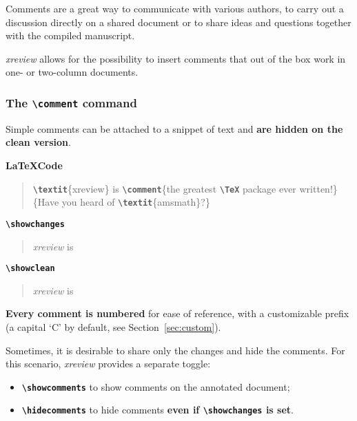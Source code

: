 \documentclass[a4paper]{ltxdoc}
\newcommand{\writecommand}[1]{\texttt{\textbf{{\textbackslash#1}}}}
\newcommand{\writearg}[1]{\{#1\}}
\begin{document}
Comments are a great way to communicate with various authors, to carry out a discussion directly on a shared document or to share ideas and questions together with the compiled manuscript.

\textit{xreview} allows for the possibility to insert comments that out of the box work in one- or two-column documents. 

\subsubsection{The \writecommand{comment} command}

Simple comments can be attached to a snippet of text and \textbf{are hidden on the clean version}. 

\textbf{\LaTeX Code}

\begin{quote}
\writecommand{textit}\writearg{xreview} is \writecommand{comment}\writearg{the greatest \writecommand{TeX} package ever written!}\writearg{Have you heard of \writecommand{textit}\writearg{amsmath}?}
\end{quote}

\writecommand{showchanges}
\showchanges

\begin{quote}
\textit{xreview} is 
\end{quote}

\writecommand{showclean}
\showclean

\begin{quote}
\textit{xreview} is 
\end{quote} \addtocounter{commentcounter}{-1}

\showchanges

\textbf{Every comment is numbered} for ease of reference, with a customizable prefix (a capital `C' by default, see Section~\ref{sec:custom}).

Sometimes, it is desirable to share only the changes and hide the comments. For this scenario, \textit{xreview} provides a separate toggle:
\begin{itemize}
    \item \writecommand{showcomments} to show comments on the annotated document;
    \item \writecommand{hidecomments} to hide comments \textbf{even if \writecommand{showchanges} is set}.
\end{itemize}
\end{document}
